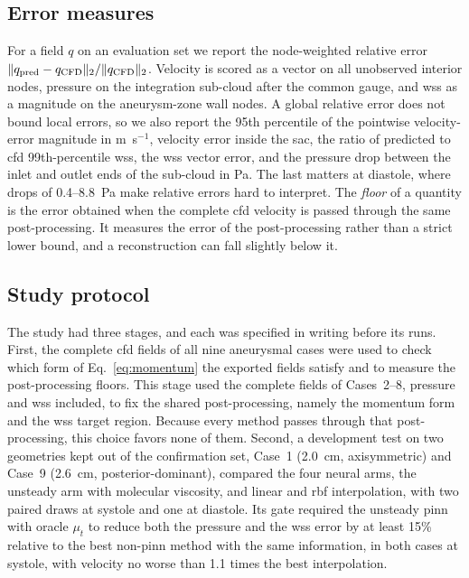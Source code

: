 \documentclass[12pt,a4paper]{article}
\newcommand{\CFD}{\ac{cfd}\xspace}
\newcommand{\PINN}{\ac{pinn}\xspace}
\newcommand{\WSS}{\ac{wss}\xspace}
\newcommand{\RBF}{\ac{rbf}\xspace}
\theoremstyle{definition}
\numberwithin{equation}{section}
\begin{document}
\subsection{Error measures}
\label{sec:metrics}
For a field $q$ on an evaluation set we report the node-weighted relative error $\|q_{\rm pred}-q_{\rm CFD}\|_2/\|q_{\rm CFD}\|_2$. Velocity is scored as a vector on all unobserved interior nodes, pressure on the integration sub-cloud after the common gauge, and \WSS as a magnitude on the aneurysm-zone wall nodes. A global relative error does not bound local errors, so we also report the 95th percentile of the pointwise velocity-error magnitude in m~s$^{-1}$, velocity error inside the sac, the ratio of predicted to \CFD 99th-percentile \WSS, the \WSS vector error, and the pressure drop between the inlet and outlet ends of the sub-cloud in Pa. The last matters at diastole, where drops of 0.4--8.8~Pa make relative errors hard to interpret. The \emph{floor} of a quantity is the error obtained when the complete \CFD velocity is passed through the same post-processing. It measures the error of the post-processing rather than a strict lower bound, and a reconstruction can fall slightly below it.

\subsection{Study protocol}
\label{sec:protocol}
The study had three stages, and each was specified in writing before its runs. First, the complete \CFD fields of all nine aneurysmal cases were used to check which form of Eq.~\eqref{eq:momentum} the exported fields satisfy and to measure the post-processing floors. This stage used the complete fields of Cases~2--8, pressure and \WSS included, to fix the shared post-processing, namely the momentum form and the \WSS target region. Because every method passes through that post-processing, this choice favors none of them. Second, a development test on two geometries kept out of the confirmation set, Case~1 (2.0~cm, axisymmetric) and Case~9 (2.6~cm, posterior-dominant), compared the four neural arms, the unsteady arm with molecular viscosity, and linear and \RBF interpolation, with two paired draws at systole and one at diastole. Its gate required the unsteady \PINN with oracle $\mu_t$ to reduce both the pressure and the \WSS error by at least 15\% relative to the best non-\PINN method with the same information, in both cases at systole, with velocity no worse than 1.1 times the best interpolation.
\end{document}
